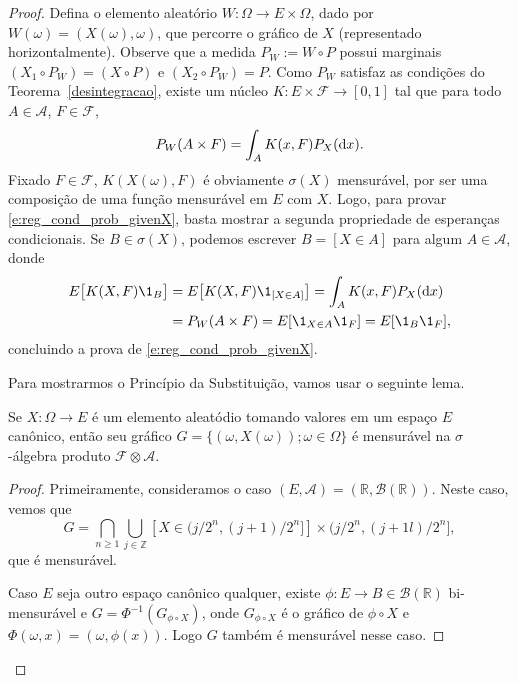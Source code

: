 \begin{proof}
  Defina o elemento aleatório $W: \Omega \to E \times \Omega$, dado por $W(\omega) = (X(\omega), \omega)$, que percorre o gráfico de $X$ (representado horizontalmente).
  Observe que a medida $P_W := W \circ P$ possui marginais $(X_1 \circ P_W) = (X \circ P)$ e $(X_2 \circ P_W) = P$.
  Como $P_W$ satisfaz as condições do Teorema~\ref{desintegracao}, existe um núcleo $K: E \times \mathcal{F} \to [0,1]$ tal que para todo $A \in \mathcal{A}$, $F \in \mathcal{F}$,
  \begin{equation}
    P_W(A \times F) = \int_A K(x, F) P_X (\mathop{}\!\mathrm{d} x).
  \end{equation}
  Fixado $F \in \mathcal{F}$, $K(X(\omega), F)$ é obviamente $\sigma(X)$ mensurável, por ser uma composição de uma função mensurável em $E$ com $X$.
  Logo, para provar \eqref{e:reg_cond_prob_givenX}, basta mostrar a segunda propriedade de esperanças condicionais.
  Se $B \in \sigma(X)$, podemos escrever $B = [X \in A]$ para algum $A \in \mathcal{A}$, donde
  \begin{equation}
    \begin{split}
      E\big[ K(X, F) \1_B \big] & = E\big[ K(X, F) \1_{[X \in A]} \big] = \int_A K(x, F) P_X(\d x)\\
      & = P_W (A \times F) = E[\1_{X \in A} \1_F] = E[\1_B \1_F],
    \end{split}
  \end{equation}
  concluindo a prova de \eqref{e:reg_cond_prob_givenX}.

  Para mostrarmos o Princípio da Substituição, vamos usar o seguinte lema.

  \begin{lemma}
    Se $X : \Omega \to E$ é um elemento aleatódio tomando valores em um espaço $E$ canônico, então seu gráfico $G = \{(\omega, X(\omega)); \omega \in \Omega\}$ é mensurável na $\sigma$-álgebra produto $\mathcal{F} \otimes \mathcal{A}$.
  \end{lemma}

  \begin{proof}
    Primeiramente, consideramos o caso $(E, \mathcal{A}) = (\mathbb{R}, \mathcal{B}(\mathbb{R}))$.
    Neste caso, vemos que
    \begin{equation}
      G = \bigcap_{n \geq 1} \bigcup_{j \in \mathbb{Z}} [X \in \big(j/2^n, (j+1)/2^n \big]] \times \big( j/2^n, (j+1l)/2^n \big],
    \end{equation}
    que é mensurável.

    Caso $E$ seja outro espaço canônico qualquer, existe $\phi: E \to B \in \mathcal{B}(\mathbb{R})$ bi-mensurável e $G = \Phi^{-1}(G_{\phi \circ X})$, onde $G_{\phi \circ X}$ é o gráfico de $\phi \circ X$ e $\Phi(\omega, x) = (\omega, \phi(x))$.
    Logo $G$ também é mensurável nesse caso.
  \end{proof}


\end{proof}
